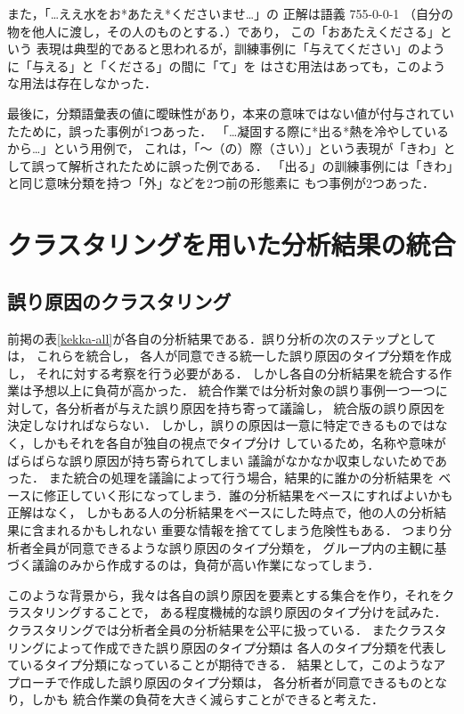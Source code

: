 \documentclass[japanese]{jnlp_1.4}
\begin{document}
また，「…ええ水をお*あたえ*くださいませ…」の
正解は語義 755-0-0-1 （自分の物を他人に渡し，その人のものとする．）であり，
この「おあたえくださる」という
表現は典型的であると思われるが，訓練事例に「与えてください」のように「与える」と「くださる」の間に「て」を
はさむ用法はあっても，このような用法は存在しなかった．

最後に，分類語彙表の値に曖昧性があり，本来の意味ではない値が付与されていたために，誤った事例が1つあった．
「…凝固する際に*出る*熱を冷やしているから…」という用例で，
これは，「〜（の）際（さい）」という表現が「きわ」として誤って解析されたために誤った例である．
「出る」の訓練事例には「きわ」と同じ意味分類を持つ「外」などを2つ前の形態素に
もつ事例が2つあった．


\section{クラスタリングを用いた分析結果の統合}

\subsection{誤り原因のクラスタリング}

前掲の\mbox{表\ref{kekka-all}}が各自の分析結果である．誤り分析の次のステップとしては，
これらを統合し，
各人が同意できる統一した誤り原因のタイプ分類を作成し，
それに対する考察を行う必要がある．
しかし各自の分析結果を統合する作業は予想以上に負荷が高かった．
統合作業では分析対象の誤り事例一つ一つに対して，各分析者が与えた誤り原因を持ち寄って議論し，
統合版の誤り原因を決定しなければならない．
しかし，誤りの原因は一意に特定できるものではなく，しかもそれを各自が独自の視点でタイプ分け
しているため，名称や意味がばらばらな誤り原因が持ち寄られてしまい
議論がなかなか収束しないためであった．
また統合の処理を議論によって行う場合，結果的に誰かの分析結果を
ベースに修正していく形になってしまう．誰の分析結果をベースにすればよいかも正解はなく，
しかもある人の分析結果をベースにした時点で，他の人の分析結果に含まれるかもしれない
重要な情報を捨ててしまう危険性もある．
つまり分析者全員が同意できるような誤り原因のタイプ分類を，
グループ内の主観に基づく議論のみから作成するのは，負荷が高い作業になってしまう．

このような背景から，我々は各自の誤り原因を要素とする集合を作り，それをクラスタリングすることで，
ある程度機械的な誤り原因のタイプ分けを試みた．
クラスタリングでは分析者全員の分析結果を公平に扱っている．
またクラスタリングによって作成できた誤り原因のタイプ分類は
各人のタイプ分類を代表しているタイプ分類になっていることが期待できる．
結果として，このようなアプローチで作成した誤り原因のタイプ分類は，
各分析者が同意できるものとなり，しかも
統合作業の負荷を大きく減らすことができると考えた．
\end{document}
